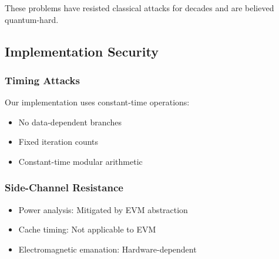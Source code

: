 These problems have resisted classical attacks for decades and are believed quantum-hard.

\subsection{Implementation Security}

\subsubsection{Timing Attacks}
Our implementation uses constant-time operations:
\begin{itemize}
\item No data-dependent branches
\item Fixed iteration counts
\item Constant-time modular arithmetic
\end{itemize}

\subsubsection{Side-Channel Resistance}
\begin{itemize}
\item Power analysis: Mitigated by EVM abstraction
\item Cache timing: Not applicable to EVM
\item Electromagnetic emanation: Hardware-dependent
\end{itemize}


